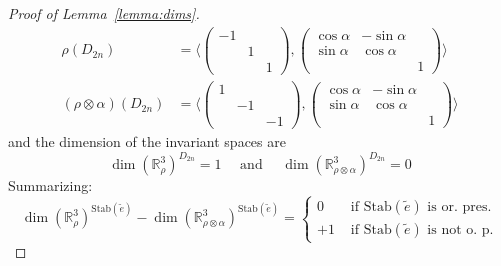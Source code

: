 \documentclass[a4paper,11pt]{article}
\begin{document}
\begin{proof}[Proof of Lemma~\ref{lemma:dims}]
\begin{align*}
 \rho( D_{2n} )&= \langle  \left(\begin{smallmatrix} -1 & & \\ & 1 & \\ & & 1 \end{smallmatrix}\right) ,
 \left(\begin{smallmatrix} \cos \alpha &  -\sin\alpha & \\ \sin\alpha & \cos \alpha & \\ & & 1 \end{smallmatrix}\right)
\rangle
\\
(\rho\otimes\alpha) (  D_{2n} )&= \langle    \left(\begin{smallmatrix} 1 & & \\ & -1 & \\ & & -1 \end{smallmatrix}\right),
    \left(\begin{smallmatrix} \cos \alpha &  -\sin\alpha & \\ \sin\alpha & \cos \alpha & \\ & & 1 \end{smallmatrix}\right)
\rangle
\end{align*}
and the dimension of the invariant spaces are 
$$
 \dim(\mathbb R^3_{\rho})^{D_{2n}}= 1
\quad \textrm{ and }\quad
 \dim(\mathbb R^3_{\rho\otimes\alpha})^{D_{2n}}= 0
$$
Summarizing:
\begin{equation}
 \label{eqn:dimsnonor}
 \dim  ( \mathbb R^3_\rho   )^{\mathrm{Stab}(\tilde e)}- \dim  ( \mathbb R^3_{\rho\otimes\alpha } )  ^{\mathrm{Stab}(\tilde e)}
 =\begin{cases}
0 & \textrm{ if }\mathrm{Stab}(\tilde e)\textrm{ is or.~pres.} \\
+1 & \textrm{ if }\mathrm{Stab}(\tilde e)\textrm{ is not o.~p.}

\end{cases}
\end{equation}
\end{proof}
\end{document}

